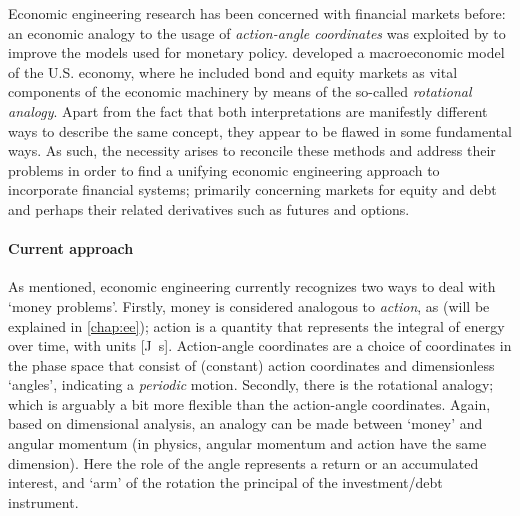 Economic engineering research has been concerned with financial markets before: an economic analogy to the usage of 
\emph{action-angle coordinates} was exploited by \citet{Vos2019} to improve the models used for monetary policy. \citet{Kruimer2021} developed a macroeconomic model of the U.S. economy, where he included bond and equity markets as vital components of the economic machinery by means of the so-called \emph{rotational analogy}. Apart from the fact that both interpretations are manifestly different ways to describe the same concept, they appear to be flawed in some fundamental ways. As such, the necessity arises to reconcile these methods and address their problems in order to find a unifying economic engineering approach to incorporate financial systems; primarily concerning markets for equity and debt and perhaps their related derivatives such as futures and options. 

\paragraph{Current approach} As mentioned, economic engineering currently recognizes two ways to deal with 
`money problems'. Firstly, money is considered analogous to \emph{action}, as (will be explained in \cref{chap:ee}); action is a quantity that represents the integral of energy over time, with units [\si{\joule \second}]. Action-angle coordinates are a choice of coordinates in the phase space that consist of (constant) action coordinates and dimensionless `angles', indicating a \emph{periodic} motion. Secondly, there is the rotational analogy; which is arguably a bit more flexible than the action-angle coordinates. Again, based on dimensional analysis, an analogy can be made between `money' and angular momentum (in physics, angular momentum and action have the same dimension). Here the role of the angle represents a return or an accumulated interest, and `arm' of the rotation the principal of the investment/debt instrument.

